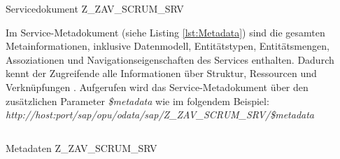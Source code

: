 \begin{listing}[h]
	\inputminted{xml}{src/servicedokument-short.xml}
	\caption{Servicedokument Z\_ZAV\_SCRUM\_SRV}
	\label{lst:Servicedokument}
\end{listing}

Im Service-Metadokument (siehe Listing \ref{lst:Metadata}) sind die gesamten Metainformationen, inklusive Datenmodell, Entitätstypen, Entitätsmengen, Assoziationen und Navigationseigenschaften des Services enthalten. Dadurch kennt der Zugreifende alle Informationen über Struktur, Ressourcen und Verknüpfungen \cite[S.\ 81-82]{BoennenDreesFischerHeinzStrothmann2014}. Aufgerufen wird das Service-Metadokument über den zusätzlichen Parameter \textit{\$metadata} wie im folgendem Beispiel: 
\\\textit{http://host:port/sap/opu/odata/sap/Z\_ZAV\_SCRUM\_SRV/\$metadata}

\begin{listing}[h]
	\inputminted{xml}{src/metadata.xml}
	\caption{Metadaten Z\_ZAV\_SCRUM\_SRV}
	\label{lst:Metadata}
\end{listing}